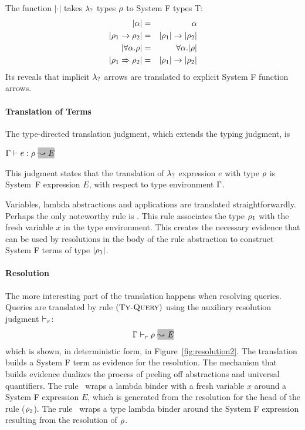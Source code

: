 The function $|\cdot|$ takes 
$\lambda_{?}$ types $\rho$ to System F types T: 
\begin{eqnarray*}
|\alpha| & = & \alpha \\
|\rulet_1 \arrow \rulet_2| & = & |\rulet_1| \arrow |\rulet_2| \\
|\forall \alpha. \rulet| & = & \forall \alpha. |\rulet| \\
|\rulet_1 \iarrow \rulet_2| & = & |\rulet_1| \arrow |\rulet_2| %
\end{eqnarray*}
Its reveals that implicit $\lambda_{?}$ arrows are translated to explicit System F function arrows.

\paragraph{Translation of Terms}

The type-directed translation judgment, which extends the typing judgment, is 
\begin{center}
  $\tenv \turns \relation{e}{\rulet}~\gbox{\leadsto E}$
\end{center}
This judgment states that the translation of $\lambda_{?}$ expression $e$ with
type $\rho$ is System~F expression $E$, with respect to type environment
$\Gamma$.

Variables, lambda abstractions and applications
are translated straightforwardly. Perhaps the only noteworthy 
rule is \TyIAbs. This rule associates the type $\rho_1$ with 
the fresh variable $x$ in the type environment. 
This creates the necessary evidence that can be used by resolutions 
in the body of the rule abstraction to construct System F terms of type $|\rho_1|$. 

\paragraph{Resolution}
The more interesting part of the translation happens when resolving queries.
Queries are translated by rule $\mbox{({\tt\sc Ty-Query})}$ using the auxiliary resolution
judgment $\vdash_{r}$:
\begin{equation*}
\tenv \vturns \rulet~\gbox{\leadsto E}
\end{equation*}
which is shown, in deterministic form, in Figure~\ref{fig:resolution2}.
The translation builds a System F term as evidence for the resolution.
The mechanism that builds evidence dualizes the process of peeling off
abstractions and universal 
quantifiers. The rule ~wraps a lambda binder with a fresh variable 
$x$ around a System F expression $E$, which is generated from the resolution 
for the head of the rule ($\rho_2$). The rule ~wraps a type lambda binder 
around the System F expression resulting from the resolution of $\rho$.

